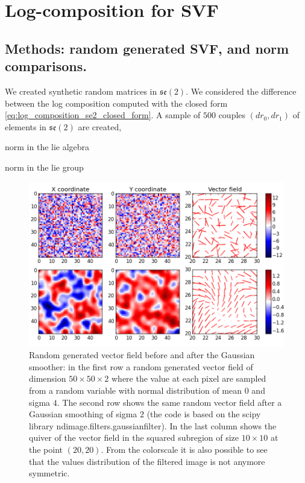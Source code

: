 \section{Log-composition for SVF}


\subsection{Methods: random generated SVF, and norm comparisons.}
We created synthetic random matrices in $\mathfrak{se}(2)$. We considered the difference between the log composition computed with the closed form \ref{eq:log_composition_se2_closed_form}. 
A sample of $500$ couples $(dr_0,dr_1)$ of elements in $\mathfrak{se}(2)$ are created, 

norm in the lie algebra

norm in the lie group

\begin{figure}[!ht]
	\hspace{-1.4cm}
	\includegraphics[scale=0.75]{figures/gaussian_smoothing_effect.png}
	\caption{Random generated vector field before and after the Gaussian smoother: in the first row a random generated vector field of dimension $50\times 50 \times 2$ where the value at each pixel are sampled from a random variable with normal distribution of mean $0$ and sigma $4$. The second row shows the same random vector field after a Gaussian smoothing of sigma $2$ (the code is based on the scipy library ndimage.filters.gaussian\textunderscore filter). In the last column shows the quiver of the vector field in the squared subregion of size $10\times 10$ at the point $(20,20)$. From the colorscale it is also possible to see that the values distribution of the filtered image is not anymore symmetric. }
	\label{fig:svf_gaussian_smoothing_effects}
\end{figure}


